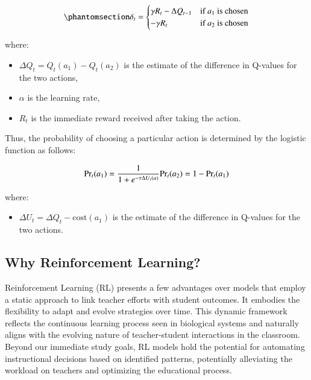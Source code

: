 \documentclass[
  number,
  preprint,
  3p,
  onecolumn]{elsarticle}
\providecommand{\tightlist}{%
  \setlength{\itemsep}{0pt}\setlength{\parskip}{0pt}}\usepackage{longtable,booktabs,array}
\begin{document}
\begin{equation}\phantomsection\label{eq-state-free}{
\delta_t =
\begin{cases}
\gamma R_t - \Delta Q_{t-1} & \text{if } a_1 \text{ is chosen} \\
-\gamma R_t & \text{if } a_2 \text{ is chosen}
\end{cases}
}\end{equation}

where:

\begin{itemize}
\item
  \(\Delta Q_{t}=Q_{t}(a_1)-Q_{t}(a_2)\) is the estimate of the
  difference in Q-values for the two actions,
\item
  \(\alpha\) is the learning rate,
\item
  \(R_t\) is the immediate reward received after taking the action.
\end{itemize}

Thus, the probability of choosing a particular action is determined by
the logistic function as follows:

\[
\text{Pr}_t(a_1) = \frac{1}{1+e^{-\tau \Delta U_{t}(a)}}
\\
\text{Pr}_t(a_2) = 1 - \text{Pr}_t(a_1)
\]

where:

\begin{itemize}
\tightlist
\item
  \(\Delta U_{t}=\Delta Q_{t} - \text{cost}(a_1)\) is the estimate of
  the difference in Q-values for the two actions.
\end{itemize}

\subsection{Why Reinforcement
Learning?}\label{why-reinforcement-learning}

Reinforcement Learning (RL) presents a few advantages over models that
employ a static approach to link teacher efforts with student outcomes.
It embodies the flexibility to adapt and evolve strategies over time.
This dynamic framework reflects the continuous learning process seen in
biological systems and naturally aligns with the evolving nature of
teacher-student interactions in the classroom. Beyond our immediate
study goals, RL models hold the potential for automating instructional
decisions based on identified patterns, potentially alleviating the
workload on teachers and optimizing the educational process.
\end{document}
